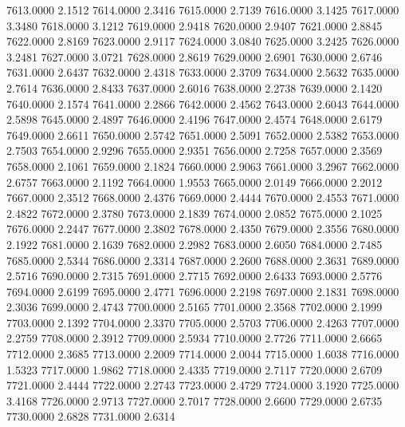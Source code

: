 7613.0000      2.1512
7614.0000      2.3416
7615.0000      2.7139
7616.0000      3.1425
7617.0000      3.3480
7618.0000      3.1212
7619.0000      2.9418
7620.0000      2.9407
7621.0000      2.8845
7622.0000      2.8169
7623.0000      2.9117
7624.0000      3.0840
7625.0000      3.2425
7626.0000      3.2481
7627.0000      3.0721
7628.0000      2.8619
7629.0000      2.6901
7630.0000      2.6746
7631.0000      2.6437
7632.0000      2.4318
7633.0000      2.3709
7634.0000      2.5632
7635.0000      2.7614
7636.0000      2.8433
7637.0000      2.6016
7638.0000      2.2738
7639.0000      2.1420
7640.0000      2.1574
7641.0000      2.2866
7642.0000      2.4562
7643.0000      2.6043
7644.0000      2.5898
7645.0000      2.4897
7646.0000      2.4196
7647.0000      2.4574
7648.0000      2.6179
7649.0000      2.6611
7650.0000      2.5742
7651.0000      2.5091
7652.0000      2.5382
7653.0000      2.7503
7654.0000      2.9296
7655.0000      2.9351
7656.0000      2.7258
7657.0000      2.3569
7658.0000      2.1061
7659.0000      2.1824
7660.0000      2.9063
7661.0000      3.2967
7662.0000      2.6757
7663.0000      2.1192
7664.0000      1.9553
7665.0000      2.0149
7666.0000      2.2012
7667.0000      2.3512
7668.0000      2.4376
7669.0000      2.4444
7670.0000      2.4553
7671.0000      2.4822
7672.0000      2.3780
7673.0000      2.1839
7674.0000      2.0852
7675.0000      2.1025
7676.0000      2.2447
7677.0000      2.3802
7678.0000      2.4350
7679.0000      2.3556
7680.0000      2.1922
7681.0000      2.1639
7682.0000      2.2982
7683.0000      2.6050
7684.0000      2.7485
7685.0000      2.5344
7686.0000      2.3314
7687.0000      2.2600
7688.0000      2.3631
7689.0000      2.5716
7690.0000      2.7315
7691.0000      2.7715
7692.0000      2.6433
7693.0000      2.5776
7694.0000      2.6199
7695.0000      2.4771
7696.0000      2.2198
7697.0000      2.1831
7698.0000      2.3036
7699.0000      2.4743
7700.0000      2.5165
7701.0000      2.3568
7702.0000      2.1999
7703.0000      2.1392
7704.0000      2.3370
7705.0000      2.5703
7706.0000      2.4263
7707.0000      2.2759
7708.0000      2.3912
7709.0000      2.5934
7710.0000      2.7726
7711.0000      2.6665
7712.0000      2.3685
7713.0000      2.2009
7714.0000      2.0044
7715.0000      1.6038
7716.0000      1.5323
7717.0000      1.9862
7718.0000      2.4335
7719.0000      2.7117
7720.0000      2.6709
7721.0000      2.4444
7722.0000      2.2743
7723.0000      2.4729
7724.0000      3.1920
7725.0000      3.4168
7726.0000      2.9713
7727.0000      2.7017
7728.0000      2.6600
7729.0000      2.6735
7730.0000      2.6828
7731.0000      2.6314
